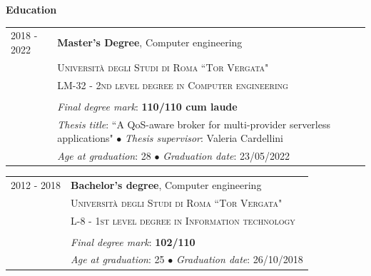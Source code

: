\documentclass[english,10pt,a4paper]{article}
\newcommand{\CvEducation}[2]{ {\small \textit{#1}: #2}}
\newcommand{\CvBullet}{\hspace{0.05cm} \textcolor{CvColor}{$\bullet$} \hspace{0.05cm}}
\newcommand{\CvSection}[2]{\vspace{0.5cm}
	\begin{tcolorbox}[colback=CvSidebarBackColor,boxrule=0pt, top=2.5pt,bottom=2.5pt, arc=0pt,outer arc=0pt]
	{\Large \textcolor{CvSidebarTextColor}{#1 \hspace{2pt} \textbf{#2}}}
	\end{tcolorbox}
	}
\newcommand{\CvTimeRange}[2]{\textcolor{CvColor}{\textsc{#1 - #2}}}
\def\SidebarHSizeFirstPage{2.5cm}
\def\BodyHSizeFirstPage{9cm}
\begin{document}
\begin{paracol}{2}
\begin{tcolorbox}[colback=white, height=\textheight,colframe=white, top=0pt,bottom=0pt]
		\CvSection{\faGraduationCap}{Education}
		
		\begin{tabular}{p{\SidebarHSizeFirstPage}|p{\BodyHSizeFirstPage}}
			\CvTimeRange{2018}{2022} & \textbf{Master’s Degree}, Computer engineering \\
			& \textsc{Università degli Studi di Roma ``Tor Vergata"} \\
			& \textsc{LM-32 - 2nd level degree in Computer engineering}\\
			& \\
			& \CvEducation{Final degree mark}{\textbf{110/110 cum laude}} \\
			& \CvEducation{Thesis title}{``A QoS-aware broker for multi-provider serverless applications"} \CvBullet \CvEducation{Thesis supervisor}{Valeria Cardellini} \\
			& \CvEducation{Age at graduation}{28} \CvBullet \CvEducation{Graduation date}{23/05/2022}	
		\end{tabular}
		
		\vspace{0.2cm}
		
		\begin{tabular}{p{\SidebarHSizeFirstPage}|p{\BodyHSizeFirstPage}}
			\CvTimeRange{2012}{2018} & \textbf{Bachelor's degree}, Computer engineering \\
			& \textsc{Università degli Studi di Roma ``Tor Vergata"} \\
			& \textsc{L-8 - 1st level degree in Information technology}\\
			& \\
			& \CvEducation{Final degree mark}{\textbf{102/110}} \\	
			& \CvEducation{Age at graduation}{25} \CvBullet \CvEducation{Graduation date}{26/10/2018}	
		\end{tabular}
		
		\vspace{0.2cm}
		

\end{tcolorbox}
\end{paracol}
\end{document}
